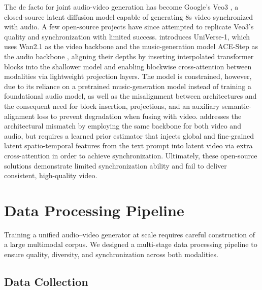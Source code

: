 \documentclass{article} %
\begin{document}
The de facto for joint audio-video generation has become Google's Veo3 \citep{veo3}, a closed-source latent diffusion model capable of generating 8s video synchronized with audio. A few open-source projects have since attempted to replicate Veo3's quality and synchronization with limited success. \citet{wang2025universe} introduces UniVerse-1, which uses Wan2.1 as the video backbone and the music-generation model ACE-Step as the audio backbone \citep{gong2025ace}, aligning their depths by inserting interpolated transformer blocks into the shallower model and enabling blockwise cross-attention between modalities via lightweight projection layers. The model is constrained, however, due to its reliance on a pretrained music-generation model instead of training a foundational audio model, as well as the misalignment between architectures and the consequent need for block insertion, projections, and an auxiliary semantic-alignment loss to prevent degradation when fusing with video. \citep{liu2025javisdit} addresses the architectural mismatch by employing the same backbone for both video and audio, but requires a learned  prior estimator that injects global and fine-grained latent spatio-temporal features from the text prompt into latent video via extra cross-attention in order to achieve synchronization. Ultimately, these open-source solutions demonstrate limited synchronization ability and fail to deliver consistent, high-quality video.

\section{Data Processing Pipeline}

Training a unified audio–video generator at scale requires careful construction of a large multimodal corpus. We designed a multi-stage data processing pipeline to ensure quality, diversity, and synchronization across both modalities.

\subsection{Data Collection}
\end{document}

